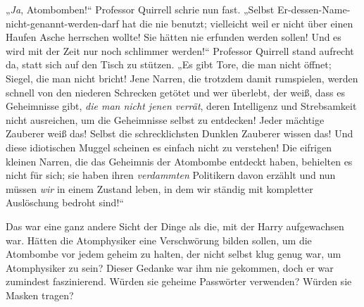 „\emph{Ja}, Atombomben!“ Professor Quirrell schrie nun fast. „Selbst Er-dessen-Name-nicht-genannt-werden-darf hat die nie benutzt; vielleicht weil er nicht über einen Haufen Asche herrschen wollte! Sie hätten nie erfunden werden sollen! Und es wird mit der Zeit nur noch schlimmer werden!“ Professor Quirrell stand aufrecht da, statt sich auf den Tisch zu stützen. „Es gibt Tore, die man nicht öffnet; Siegel, die man nicht bricht! Jene Narren, die trotzdem damit rumspielen, werden schnell von den niederen Schrecken getötet und wer überlebt, der weiß, dass es Geheimnisse gibt, \emph{die man nicht jenen verrät}, deren Intelligenz und Strebsamkeit nicht ausreichen, um die Geheimnisse selbst zu entdecken! Jeder mächtige Zauberer weiß das! Selbst die schrecklichsten Dunklen Zauberer wissen das! Und diese idiotischen Muggel scheinen es einfach nicht zu verstehen! Die eifrigen kleinen Narren, die das Geheimnis der Atombombe entdeckt haben, behielten es nicht für sich; sie haben ihren \emph{verdammten} Politikern davon erzählt und nun müssen \emph{wir} in einem Zustand leben, in dem wir ständig mit kompletter Auslöschung bedroht sind!“

Das war eine ganz andere Sicht der Dinge als die, mit der Harry aufgewachsen war. Hätten die Atomphysiker eine Verschwörung bilden sollen, um die Atombombe vor jedem geheim zu halten, der nicht selbst klug genug war, um Atomphysiker zu sein? Dieser Gedanke war ihm nie gekommen, doch er war zumindest faszinierend. Würden sie geheime Passwörter verwenden? Würden sie Masken tragen?

